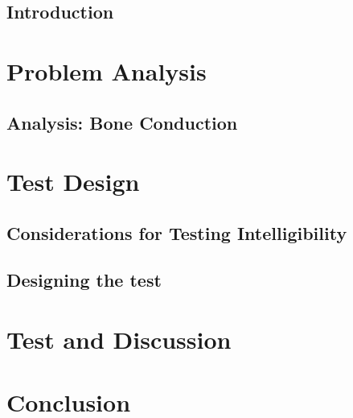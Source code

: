 \glsresetall
 \graphicspath{{figures/analysing/}}
\chapter{Introduction}\label{ch:intro}



\part{Problem Analysis}\label{pt:analysis} \glsresetall
\graphicspath{{figures/analysis/}}
\chapter{Analysis: Bone Conduction}\label{ch:bone_conductors}







\part{Test Design}\label{pt:design} 
\graphicspath{{figures/design/}}	
\chapter{Considerations for Testing Intelligibility}\label{ch:test_considerations}





\chapter{Designing the test}\label{ch:test_design}




\part{Test and Discussion}\label{pt:test}
\graphicspath{{figures/tests/}}






 
\part{Conclusion}\label{pt:conclusion}




